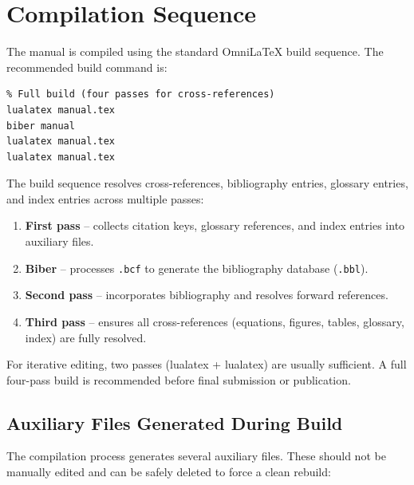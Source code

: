 \section*{Compilation Sequence}

The manual is compiled using the standard OmniLaTeX build sequence.
The recommended build command is:

\begin{verbatim}
% Full build (four passes for cross-references)
lualatex manual.tex
biber manual
lualatex manual.tex
lualatex manual.tex
\end{verbatim}

The build sequence resolves cross-references, bibliography entries,
glossary entries, and index entries across multiple passes:

\begin{enumerate}
    \item \textbf{First pass} -- collects citation keys, glossary references,
          and index entries into auxiliary files.
    \item \textbf{Biber} -- processes \texttt{.bcf} to generate the
          bibliography database (\texttt{.bbl}).
    \item \textbf{Second pass} -- incorporates bibliography and resolves
          forward references.
    \item \textbf{Third pass} -- ensures all cross-references (equations,
          figures, tables, glossary, index) are fully resolved.
\end{enumerate}

For iterative editing, two passes (lualatex + lualatex) are usually
sufficient.  A full four-pass build is recommended before final submission
or publication.

\subsection*{Auxiliary Files Generated During Build}

The compilation process generates several auxiliary files.  These should not
be manually edited and can be safely deleted to force a clean rebuild:

